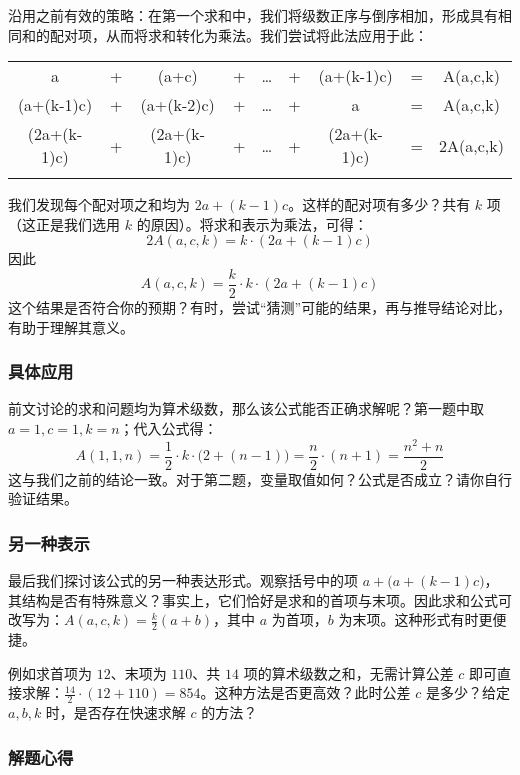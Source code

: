沿用之前有效的策略：在第一个求和中，我们将级数正序与倒序相加，形成具有相同和的配对项，从而将求和转化为乘法。我们尝试将此法应用于此：
\begin{center}
    \begin{tabular}{ccccccccc}
                 a & + &      (a+c) & + & \dots & + & (a+(k-1)c) & = & A(a,c,k)\\\noalign{\smallskip\smallskip}
        (a+(k-1)c) & + & (a+(k-2)c) & + & \dots & + &          a & = & A(a,c,k)\\\noalign{\smallskip\smallskip}
        \hline
        (2a+(k-1)c)& + & (2a+(k-1)c)& + & \dots & + &(2a+(k-1)c) & = &2A(a,c,k)\\\noalign{\smallskip\smallskip}
    \end{tabular}
\end{center}
我们发现每个配对项之和均为 $2a + (k-1)c$。这样的配对项有多少？共有 $k$ 项（这正是我们选用 $k$ 的原因）。将求和表示为乘法，可得：
\[2A(a, c, k) = k \cdot (2a + (k - 1)c)\]
因此
\[A(a, c, k) = \frac{k}{2} \cdot k \cdot (2a + (k - 1)c)\]
这个结果是否符合你的预期？有时，尝试``猜测''可能的结果，再与推导结论对比，有助于理解其意义。

\subsubsection*{具体应用}

前文讨论的求和问题均为算术级数，那么该公式能否正确求解呢？第一题中取 $a = 1,c = 1, k = n$；代入公式得：
\[A(1, 1, n) = \frac{1}{2} \cdot k \cdot \big(2 + (n - 1)\big) = \frac{n}{2} \cdot(n+1) = \frac{n^2+n}{2}\]
这与我们之前的结论一致。对于第二题，变量取值如何？公式是否成立？请你自行验证结果。

\subsubsection*{另一种表示}

最后我们探讨该公式的另一种表达形式。观察括号中的项 $a + \big(a + (k-1)c\big)$，其结构是否有特殊意义？事实上，它们恰好是求和的首项与末项。因此求和公式可改写为：$A(a, c, k) = \frac{k}{2}(a + b)$，其中 $a$ 为首项，$b$ 为末项。这种形式有时更便捷。

例如求首项为 $12$、末项为 $110$、共 $14$ 项的算术级数之和，无需计算公差 $c$ 即可直接求解：$\frac{14}{2} \cdot (12 + 110) = 854$。这种方法是否更高效？此时公差 $c$ 是多少？给定 $a,b,k$ 时，是否存在快速求解 $c$ 的方法？

\subsubsection*{解题心得}

